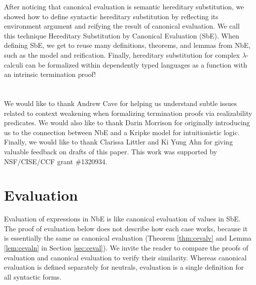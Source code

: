 \documentclass{llncs}
\newcommand{\refthm}[1]{Theorem \ref{thm:#1}}
\newcommand{\reflem}[1]{Lemma \ref{lem:#1}}
\newcommand{\refsec}[1]{Section \ref{sec:#1}}
\begin{document}
After noticing that canonical evaluation is semantic hereditary
substitution, we showed how to define syntactic hereditary
substitution by reflecting its environment argument and reifying the
result of canonical evaluation. We call this technique Hereditary
Substitution by Canonical Evaluation (SbE). When defining SbE, we get
to reuse many definitions, theorems, and lemmas from NbE, such as the
model and reification. Finally, hereditary substitution for complex
$\lambda$-calculi can be formalized within dependently typed languages
as a function with an intrinsic termination proof!

\section*{\ackname}

We would like to thank Andrew Cave for helping us understand subtle
issues related to context weakening when formalizing termination
proofs via realizability predicates. We would also
like to thank Darin Morrison for originally introducing us to the connection
between NbE and a Kripke model for intuitionistic logic. Finally, we
would like to thank Clarissa Littler and Ki Yung Ahn for giving
valuable feedback on drafts of this paper.
This work was supported by NSF/CISE/CCF grant \#1320934.






\clearpage

\section*{\appendixname}
\appendix

\section{Evaluation}
\label{sec:eval}

Evaluation of expressions in NbE is like canonical evaluation of
values in SbE. The proof of evaluation below does not describe how
each case works, because it is essentially the same as
canonical evaluation (\refthm{cevalv} and \reflem{cevaln} in
\refsec{ceval}). We invite the reader to compare the proofs of
evaluation and canonical evaluation to verify their similarity.
Whereas canonical evaluation is defined separately for neutrals,
evaluation is a single definition for all syntactic forms.
\end{document}
